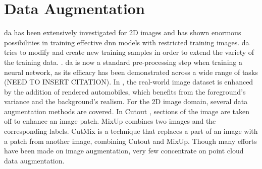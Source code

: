 \section{Data Augmentation}
\acrfull{da} has been extensively investigated for 2D images \parencite{transfsim2000, NIPS2000_ba9a56ce} and has shown enormous possibilities in training effective \acrshort{dnn} models with restricted training images. \acrshort{da} tries to modify and create new training samples in order to extend the variety of the training data. \parencite{xiao2022polarmix} . \acrshort{da} is now a standard pre-processing step when training a neural network, as its efficacy has been demonstrated across a wide range of tasks (NEED TO INSERT CITATION). In \parencite{abs-1708-01566}, the real-world image dataset is enhanced by the addition of rendered automobiles, which benefits from the foreground's variance and the background's realism. For the 2D image domain, several data augmentation methods are covered. In Cutout \parencite{cutout}, sections of the image are taken off to enhance an image patch. MixUp \parencite{mixup} combines two images and the corresponding labels. CutMix \parencite{cutmix} is a technique that replaces a part of an image with a patch from another image, combining Cutout and MixUp. Though many efforts have been made on image augmentation, very few concentrate on point cloud data augmentation.

